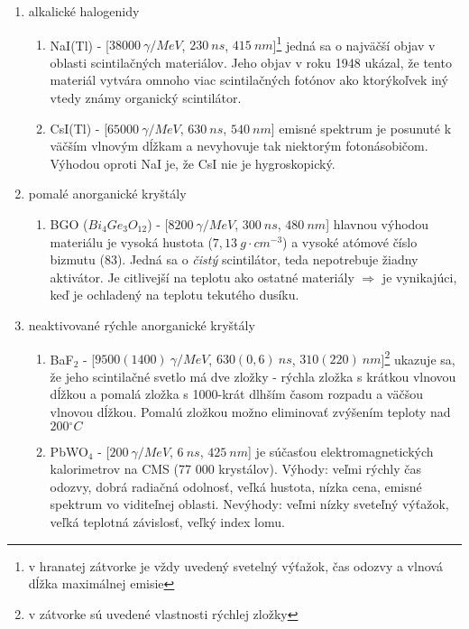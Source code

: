 \documentclass[../../main.tex]{subfiles}
\begin{document}
\begin{enumerate}
\begin{enumerate}
\item alkalické halogenidy 
\begin{enumerate}
\item NaI(Tl) - [$38000\:\unit{\gamma/MeV}$, $230\:\unit{ns}$, $415\:\unit{nm}$]\footnote{v hranatej zátvorke je vždy uvedený svetelný výťažok, čas odozvy a vlnová dĺžka maximálnej emisie} jedná sa o najväčší objav v oblasti scintilačných materiálov. Jeho objav v roku 1948 ukázal, že tento materiál vytvára omnoho viac scintilačných fotónov ako ktorýkoľvek iný vtedy známy organický scintilátor.
\item CsI(Tl) - [$65000\:\unit{\gamma/MeV}$, $630\:\unit{ns}$, $540\:\unit{nm}$] emisné spektrum je posunuté k väčším vlnovým dĺžkam a nevyhovuje tak niektorým fotonásobičom. Výhodou oproti NaI je, že CsI nie je hygroskopický.
\end{enumerate}
\item pomalé anorganické kryštály
\begin{enumerate}
\item BGO ($Bi_4Ge_3O_{12}$) - [$8200\:\unit{\gamma/MeV}$, $300\:\unit{ns}$, $480\:\unit{nm}$] hlavnou výhodou materiálu je vysoká hustota ($7,13\:\unit{g\cdot cm^{-3}}$) a vysoké atómové číslo bizmutu (83). Jedná sa o \textit{čistý} scintilátor, teda nepotrebuje žiadny aktivátor. Je citlivejší na teplotu ako ostatné materiály $\Rightarrow$ je vynikajúci, keď je ochladený na teplotu tekutého dusíku.
\end{enumerate}
\item neaktivované rýchle anorganické kryštály
\begin{enumerate}
\item BaF$_2$ - [$9500(1400)\:\unit{\gamma/MeV}$, $630(0,6)\:\unit{ns}$, $310(220)\:\unit{nm}$]\footnote{v zátvorke sú uvedené vlastnosti rýchlej zložky} ukazuje sa, že jeho scintilačné svetlo má dve zložky - rýchla zložka s krátkou vlnovou dĺžkou a pomalá zložka s 1000-krát dlhším časom rozpadu a väčšou vlnovou dĺžkou. Pomalú zložkou možno eliminovať zvýšením teploty nad $200\unit{^\circ C}$
\item PbWO$_4$ - [$200\:\unit{\gamma/MeV}$, $6\:\unit{ns}$, $425\:\unit{nm}$] je súčasťou elektromagnetických kalorimetrov na CMS (77 000 krystálov). Výhody: veľmi rýchly čas odozvy, dobrá radiačná odolnosť, veľká hustota, nízka cena, emisné spektrum vo viditeľnej oblasti. Nevýhody: veľmi nízky sveteľný výťažok, veľká teplotná závislosť, veľký index lomu.
\end{enumerate}
\end{enumerate}

\end{enumerate}
\end{document}
